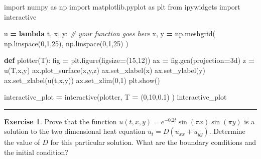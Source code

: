 \documentclass[
]{book}
\newenvironment{Shaded}{\begin{snugshade}}{\end{snugshade}}
\newcommand{\CommentTok}[1]{\textcolor[rgb]{0.56,0.35,0.01}{\textit{#1}}}
\newcommand{\DecValTok}[1]{\textcolor[rgb]{0.00,0.00,0.81}{#1}}
\newcommand{\FloatTok}[1]{\textcolor[rgb]{0.00,0.00,0.81}{#1}}
\newcommand{\ImportTok}[1]{#1}
\newcommand{\KeywordTok}[1]{\textcolor[rgb]{0.13,0.29,0.53}{\textbf{#1}}}
\newcommand{\NormalTok}[1]{#1}
\newcommand{\OperatorTok}[1]{\textcolor[rgb]{0.81,0.36,0.00}{\textbf{#1}}}
\newcommand{\StringTok}[1]{\textcolor[rgb]{0.31,0.60,0.02}{#1}}
\theoremstyle{definition}
\theoremstyle{definition}
\theoremstyle{definition}
\newtheorem{exercise}{Exercise}[chapter]
\theoremstyle{remark}
\begin{document}
\begin{Shaded}
\begin{Highlighting}[]
\ImportTok{import}\NormalTok{ numpy }\ImportTok{as}\NormalTok{ np}
\ImportTok{import}\NormalTok{ matplotlib.pyplot }\ImportTok{as}\NormalTok{ plt}
\ImportTok{from}\NormalTok{ ipywidgets }\ImportTok{import}\NormalTok{ interactive}

\NormalTok{u }\OperatorTok{=} \KeywordTok{lambda}\NormalTok{ t, x, y: }\CommentTok{\# your function goes here}
\NormalTok{x, y }\OperatorTok{=}\NormalTok{ np.meshgrid( np.linspace(}\DecValTok{0}\NormalTok{,}\DecValTok{1}\NormalTok{,}\DecValTok{25}\NormalTok{), np.linspace(}\DecValTok{0}\NormalTok{,}\DecValTok{1}\NormalTok{,}\DecValTok{25}\NormalTok{) )}

\KeywordTok{def}\NormalTok{ plotter(T):}
\NormalTok{    fig }\OperatorTok{=}\NormalTok{ plt.figure(figsize}\OperatorTok{=}\NormalTok{(}\DecValTok{15}\NormalTok{,}\DecValTok{12}\NormalTok{))}
\NormalTok{    ax }\OperatorTok{=}\NormalTok{ fig.gca(projection}\OperatorTok{=}\StringTok{\textquotesingle{}3d\textquotesingle{}}\NormalTok{)}
\NormalTok{    z }\OperatorTok{=}\NormalTok{ u(T,x,y)}
\NormalTok{    ax.plot\_surface(x,y,z)}
\NormalTok{    ax.set\_xlabel(}\StringTok{\textquotesingle{}x\textquotesingle{}}\NormalTok{)}
\NormalTok{    ax.set\_ylabel(}\StringTok{\textquotesingle{}y\textquotesingle{}}\NormalTok{)}
\NormalTok{    ax.set\_zlabel(}\StringTok{\textquotesingle{}u(t,x,y)\textquotesingle{}}\NormalTok{)}
\NormalTok{    ax.set\_zlim(}\DecValTok{0}\NormalTok{,}\DecValTok{1}\NormalTok{)}
\NormalTok{    plt.show()}

\NormalTok{interactive\_plot }\OperatorTok{=}\NormalTok{ interactive(plotter, T }\OperatorTok{=}\NormalTok{ (}\DecValTok{0}\NormalTok{,}\DecValTok{10}\NormalTok{,}\FloatTok{0.1}\NormalTok{) )}
\NormalTok{interactive\_plot}
\end{Highlighting}
\end{Shaded}

\begin{center}\rule{0.5\linewidth}{0.5pt}\end{center}

\begin{exercise}
\protect\hypertarget{exr:unnamed-chunk-531}{}{\label{exr:unnamed-chunk-531} }Prove that the function \(u(t,x,y) = e^{-0.2t} \sin(\pi x) \sin(\pi y)\) is a solution to the two dimensional heat equation \(u_t = D(u_{xx} + u_{yy})\). Determine the value of \(D\) for this particular solution. What are the boundary conditions and the initial condition?
\end{exercise}
\end{document}

